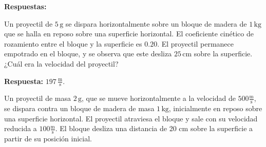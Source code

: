 \documentclass[addpoints]{exam}
\newcommand{\un}[1]{\text{#1}}
\newcommand{\rta}{\textbf{Respuesta: }}
\newcommand{\rtas}{\textbf{Respuestas: }}
\begin{document}
\begin{questions}

    \rtas 

    \question Un proyectil de $5 \, \un{g}$ se dispara horizontalmente sobre un bloque de madera de $1 \, \un{kg}$ que se halla en reposo sobre una superficie horizontal. El coeficiente cinético de rozamiento entre el bloque y la superficie es $0.20$. El proyectil permanece empotrado en el bloque, y se observa que este desliza $25 \, \un{cm}$ sobre la superficie. ¿Cuál era la velocidad del proyectil?

    \rta $197 \, \frac{\text{m}}{\text{s}}$.

    \question Un proyectil de masa $2 \, \un{g}$, que se mueve horizontalmente a la velocidad de $500 \frac{\un{m}}{\un{s}}$, se dispara contra un bloque de madera de masa $1 \, \un{kg}$, inicialmente en reposo sobre una superficie horizontal. El proyectil atraviesa el bloque y sale con su velocidad reducida a $100 \frac{\un{m}}{\un{s}}$. El bloque desliza una distancia de 20 cm sobre la superficie a partir de su posición inicial. 

\end{questions}
\end{document}
